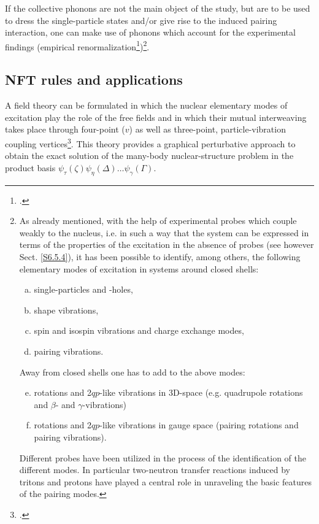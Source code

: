 If the collective phonons are not the main object  of the study, but are to be used to dress the single-particle states and/or give rise to the induced pairing interaction, one can make use of phonons which account for the experimental findings (empirical renormalization\footnote{\cite{Idini:15,Broglia:16,Barranco:17}.})\footnote{As already mentioned, with the help of experimental probes which couple weakly to the nucleus,
i.e. in such a way that the system can be expressed in terms of the properties
of the excitation in the absence of probes (see however Sect. \ref{S6.5.4}), it has been possible to identify, among others, the
following elementary modes of excitation in systems around closed shells:
\begin{enumerate}[a)]
\item single-particles and -holes,
\item shape vibrations,
\item spin and isospin vibrations and charge exchange modes,
\item pairing vibrations.
\end{enumerate}
Away from closed shells one has to add to the above modes:
\begin{enumerate}[a)]
\setcounter{enumi}{4}
\item rotations and 2$qp$-like vibrations in 3D-space (e.g. quadrupole rotations and $\beta$- and $\gamma$-vibrations)
\item rotations and 2$qp$-like vibrations in gauge space (pairing rotations and pairing vibrations).
\end{enumerate}
Different probes have been utilized in the process of the identification of the different modes. In particular two-neutron transfer reactions induced by tritons
and protons have played a central role in unraveling the basic features of the pairing modes.}.




 
\subsection{NFT rules and applications}\label{Sect1.7.2}
A field theory can be formulated in which the nuclear elementary modes of
excitation  play the role of the free fields and in which their mutual interweaving takes place through four-point ($v$) as well as three-point, particle-vibration coupling vertices\footnote{\cite{Bes:74,Broglia:76,Bohr:75,Mottelson:76}.}.
This theory provides a graphical perturbative approach to obtain the exact
solution of the many-body nuclear-structure problem in the product basis $\psi_\tau(\zeta)\psi_\eta(\Delta)\dots\psi_\gamma(\Gamma)$.




